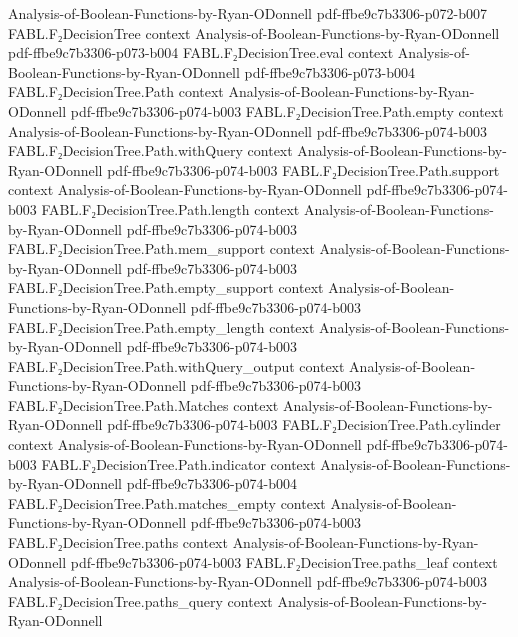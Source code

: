\begin{theorem}
  {Analysis-of-Boolean-Functions-by-Ryan-ODonnell}
  {pdf-ffbe9c7b3306-p072-b007}
\proofstep
  {FABL.F₂DecisionTree}
  {context}
  {Analysis-of-Boolean-Functions-by-Ryan-ODonnell}
  {pdf-ffbe9c7b3306-p073-b004}
\proofstep
  {FABL.F₂DecisionTree.eval}
  {context}
  {Analysis-of-Boolean-Functions-by-Ryan-ODonnell}
  {pdf-ffbe9c7b3306-p073-b004}
\proofstep
  {FABL.F₂DecisionTree.Path}
  {context}
  {Analysis-of-Boolean-Functions-by-Ryan-ODonnell}
  {pdf-ffbe9c7b3306-p074-b003}
\proofstep
  {FABL.F₂DecisionTree.Path.empty}
  {context}
  {Analysis-of-Boolean-Functions-by-Ryan-ODonnell}
  {pdf-ffbe9c7b3306-p074-b003}
\proofstep
  {FABL.F₂DecisionTree.Path.withQuery}
  {context}
  {Analysis-of-Boolean-Functions-by-Ryan-ODonnell}
  {pdf-ffbe9c7b3306-p074-b003}
\proofstep
  {FABL.F₂DecisionTree.Path.support}
  {context}
  {Analysis-of-Boolean-Functions-by-Ryan-ODonnell}
  {pdf-ffbe9c7b3306-p074-b003}
\proofstep
  {FABL.F₂DecisionTree.Path.length}
  {context}
  {Analysis-of-Boolean-Functions-by-Ryan-ODonnell}
  {pdf-ffbe9c7b3306-p074-b003}
\proofstep
  {FABL.F₂DecisionTree.Path.mem_support}
  {context}
  {Analysis-of-Boolean-Functions-by-Ryan-ODonnell}
  {pdf-ffbe9c7b3306-p074-b003}
\proofstep
  {FABL.F₂DecisionTree.Path.empty_support}
  {context}
  {Analysis-of-Boolean-Functions-by-Ryan-ODonnell}
  {pdf-ffbe9c7b3306-p074-b003}
\proofstep
  {FABL.F₂DecisionTree.Path.empty_length}
  {context}
  {Analysis-of-Boolean-Functions-by-Ryan-ODonnell}
  {pdf-ffbe9c7b3306-p074-b003}
\proofstep
  {FABL.F₂DecisionTree.Path.withQuery_output}
  {context}
  {Analysis-of-Boolean-Functions-by-Ryan-ODonnell}
  {pdf-ffbe9c7b3306-p074-b003}
\proofstep
  {FABL.F₂DecisionTree.Path.Matches}
  {context}
  {Analysis-of-Boolean-Functions-by-Ryan-ODonnell}
  {pdf-ffbe9c7b3306-p074-b003}
\proofstep
  {FABL.F₂DecisionTree.Path.cylinder}
  {context}
  {Analysis-of-Boolean-Functions-by-Ryan-ODonnell}
  {pdf-ffbe9c7b3306-p074-b003}
\proofstep
  {FABL.F₂DecisionTree.Path.indicator}
  {context}
  {Analysis-of-Boolean-Functions-by-Ryan-ODonnell}
  {pdf-ffbe9c7b3306-p074-b004}
\proofstep
  {FABL.F₂DecisionTree.Path.matches_empty}
  {context}
  {Analysis-of-Boolean-Functions-by-Ryan-ODonnell}
  {pdf-ffbe9c7b3306-p074-b003}
\proofstep
  {FABL.F₂DecisionTree.paths}
  {context}
  {Analysis-of-Boolean-Functions-by-Ryan-ODonnell}
  {pdf-ffbe9c7b3306-p074-b003}
\proofstep
  {FABL.F₂DecisionTree.paths_leaf}
  {context}
  {Analysis-of-Boolean-Functions-by-Ryan-ODonnell}
  {pdf-ffbe9c7b3306-p074-b003}
\proofstep
  {FABL.F₂DecisionTree.paths_query}
  {context}
  {Analysis-of-Boolean-Functions-by-Ryan-ODonnell}

\end{theorem}
